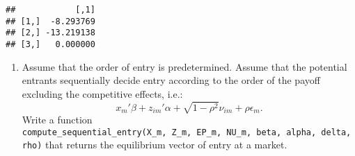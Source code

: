 \documentclass[
]{article}
\providecommand{\tightlist}{%
  \setlength{\itemsep}{0pt}\setlength{\parskip}{0pt}}
\begin{document}
\begin{verbatim}
##            [,1]
## [1,]  -8.293769
## [2,] -13.219138
## [3,]   0.000000
\end{verbatim}

\begin{enumerate}
\def\labelenumi{\arabic{enumi}.}
\setcounter{enumi}{4}
\tightlist
\item
  Assume that the order of entry is predetermined. Assume that the
  potential entrants sequentially decide entry according to the order of
  the payoff excluding the competitive effects, i.e.: \[
  x_m'\beta + z_{im}'\alpha + \sqrt{1 - \rho^2} \nu_{im} + \rho \epsilon_{m}.
  \] Write a function
  \texttt{compute\_sequential\_entry(X\_m,\ Z\_m,\ EP\_m,\ NU\_m,\ beta,\ alpha,\ delta,\ rho)}
  that returns the equilibrium vector of entry at a market.
\end{enumerate}
\end{document}
